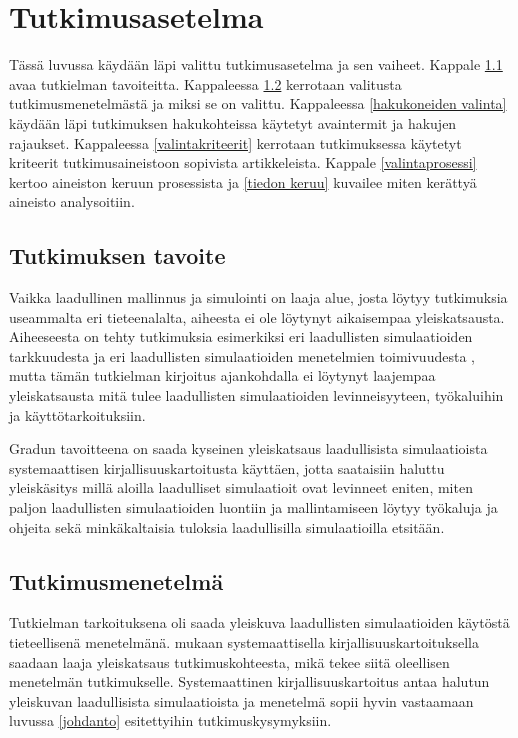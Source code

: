 \documentclass[utf8]{gradu3}
\begin{document}
\chapter{Tutkimusasetelma}
\begin{comment}
Kuten edellisessä luvussa, vähän narratiivisempi tyyli.
\end{comment}
Tässä luvussa käydään läpi valittu tutkimusasetelma ja sen vaiheet. 
Kappale \ref{tavoite} avaa tutkielman tavoiteitta.
Kappaleessa \ref{tutkimusmenetelmä} kerrotaan valitusta tutkimusmenetelmästä 
ja miksi se on valittu. Kappaleessa \ref{hakukoneiden valinta} 
käydään läpi tutkimuksen hakukohteissa käytetyt avaintermit ja hakujen rajaukset.
Kappaleessa \ref{valintakriteerit} kerrotaan tutkimuksessa käytetyt kriteerit
tutkimusaineistoon sopivista artikkeleista. 
Kappale \ref{valintaprosessi} kertoo aineiston keruun prosessista ja 
\ref{tiedon keruu} kuvailee miten kerättyä aineisto analysoitiin.

 \section{Tutkimuksen tavoite} \label{tavoite}
Vaikka laadullinen mallinnus ja simulointi on laaja alue, 
josta löytyy tutkimuksia useammalta eri tieteenalalta, 
aiheesta ei ole löytynyt aikaisempaa yleiskatsausta. Aiheeseesta on tehty tutkimuksia esimerkiksi eri laadullisten simulaatioiden tarkkuudesta \parencite{FisherManagmentTechniques2024} ja eri laadullisten simulaatioiden menetelmien toimivuudesta \parencite{qualitativeSimTechniquesAssesment1992}, mutta tämän tutkielman kirjoitus ajankohdalla ei löytynyt laajempaa yleiskatsausta mitä tulee laadullisten simulaatioiden levinneisyyteen, työkaluihin ja käyttötarkoituksiin.  

Gradun tavoitteena on saada kyseinen yleiskatsaus laadullisista simulaatioista systemaattisen kirjallisuuskartoitusta käyttäen, jotta saataisiin haluttu yleiskäsitys millä aloilla laadulliset simulaatioit ovat levinneet eniten, miten paljon laadullisten simulaatioiden luontiin ja mallintamiseen löytyy työkaluja ja ohjeita sekä minkäkaltaisia tuloksia laadullisilla simulaatioilla etsitään.

\section{Tutkimusmenetelmä} \label{tutkimusmenetelmä}
\begin{comment}
Kyse on Kitchenhamin et al raportista, joka on julkaistu Keelen yliopistossa. Kannattaa silmäillä häneltä uudempiakin artikkeleita ihan vain ajantasaisuuden mielikuvan luomiseksi.
\end{comment}
Tutkielman tarkoituksena oli saada yleiskuva laadullisten simulaatioiden käytöstä
tieteellisenä menetelmänä.
\textcite{keele2007guidelines} mukaan  systemaattisella kirjallisuuskartoituksella saadaan laaja yleiskatsaus tutkimuskohteesta,
mikä tekee siitä oleellisen menetelmän tutkimukselle. 
Systemaattinen kirjallisuuskartoitus antaa halutun yleiskuvan laadullisista simulaatioista ja menetelmä sopii hyvin vastaamaan luvussa \ref{johdanto} esitettyihin tutkimuskysymyksiin.
\end{document}
